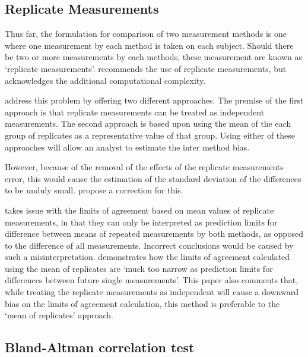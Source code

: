 \documentclass[Chap2main.tex]{subfiles}
\begin{document}
\subsection{Replicate Measurements}

Thus far, the formulation for comparison of two measurement
methods is one where one measurement by each method is taken on
each subject. Should there be two or more measurements by each
methods, these measurement are known as `replicate measurements'.
\citet{BXC2008} recommends the use of replicate measurements, but
acknowledges the additional computational complexity.

\citet*{BA86} address this problem by offering two different
approaches. The premise of the first approach is that replicate
measurements can be treated as independent measurements. The
second approach is based upon using the mean of the each group of
replicates as a representative value of that group. Using either
of these approaches will allow an analyst to estimate the inter
method bias.


However, because of the removal of the effects of the replicate
measurements error, this would cause the estimation of the
standard deviation of the differences to be unduly small.
\citet*{BA86} propose a correction for this.

\citet{BXC2008} takes issue with the limits of agreement based on
mean values of replicate measurements, in that they can only be interpreted as prediction
limits for difference between means of repeated measurements by
both methods, as opposed to the difference of all measurements.
Incorrect conclusions would be caused by such a misinterpretation.
\citet{BXC2008} demonstrates how the limits of agreement
calculated using the mean of replicates are `much too narrow as
prediction limits for differences between future single
measurements'. This paper also comments that, while treating the
replicate measurements as independent will cause a downward bias
on the limits of agreement calculation, this method is preferable
to the `mean of replicates' approach.


\subsection{Bland-Altman correlation test}
\end{document}
